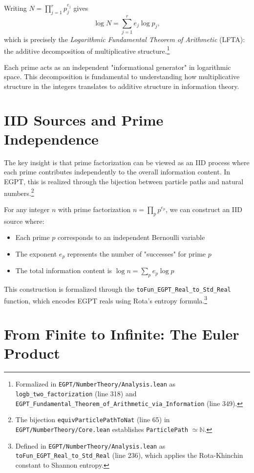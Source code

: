 \documentclass[12pt]{article}
\begin{document}
Writing $N = \prod_{j=1}^{r}p_j^{e_j}$ gives
\begin{equation}
\log N = \sum_{j=1}^{r} e_j \log p_j,
\end{equation}
which is precisely the \emph{Logarithmic Fundamental Theorem of Arithmetic} (LFTA): the additive decomposition of multiplicative structure.\footnote{Formalized in \texttt{EGPT/NumberTheory/Analysis.lean} as \texttt{logb\_two\_factorization} (line 318) and \texttt{EGPT\_Fundamental\_Theorem\_of\_Arithmetic\_via\_Information} (line 349).}

Each prime acts as an independent "informational generator" in logarithmic space. This decomposition is fundamental to understanding how multiplicative structure in the integers translates to additive structure in information theory.

\section{IID Sources and Prime Independence}

The key insight is that prime factorization can be viewed as an IID process where each prime contributes independently to the overall information content. In EGPT, this is realized through the bijection between particle paths and natural numbers.\footnote{The bijection \texttt{equivParticlePathToNat} (line 65) in \texttt{EGPT/NumberTheory/Core.lean} establishes \texttt{ParticlePath} $\simeq \mathbb{N}$.}

For any integer $n$ with prime factorization $n = \prod_p p^{e_p}$, we can construct an IID source where:
\begin{itemize}
\item Each prime $p$ corresponds to an independent Bernoulli variable
\item The exponent $e_p$ represents the number of "successes" for prime $p$
\item The total information content is $\log n = \sum_p e_p \log p$
\end{itemize}

This construction is formalized through the \texttt{toFun\_EGPT\_Real\_to\_Std\_Real} function, which encodes EGPT reals using Rota's entropy formula.\footnote{Defined in \texttt{EGPT/NumberTheory/Analysis.lean} as \texttt{toFun\_EGPT\_Real\_to\_Std\_Real} (line 236), which applies the Rota-Khinchin constant to Shannon entropy.}

\section{From Finite to Infinite: The Euler Product}
\end{document}
